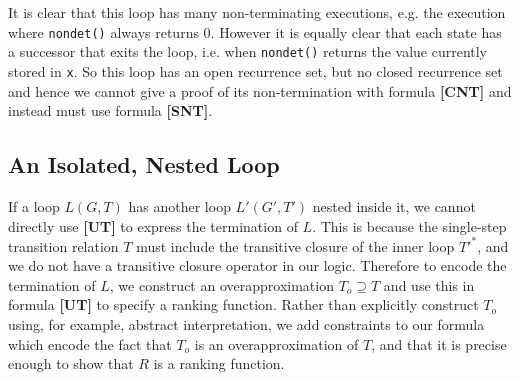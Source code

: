 \documentclass[preprint]{sigplanconf}
\theoremstyle{definition}
\begin{document}
It is clear that this loop has many non-terminating executions,
e.g. the execution where \lstinline!nondet()! always returns 0.
However it is equally clear that each state has a successor
that exits the loop, i.e. when \lstinline|nondet()| returns
the value currently stored in \lstinline|x|.  So this loop
has an open recurrence set, but no closed recurrence set
and hence we cannot give a proof of its non-termination
with formula {\bf [CNT]} and instead must use formula {\bf [SNT]}.

% 

\subsection{An Isolated, Nested Loop}
 If a loop $L(G, T)$ has another loop $L'(G', T')$ nested inside it, we cannot directly use {\bf [UT]}
to express the termination of $L$.  This is because the single-step transition relation $T$ must
include the transitive closure of the inner loop $T'^*$, and we do not have a transitive closure
operator in our logic.  Therefore to encode the termination of $L$, we construct an overapproximation
$T_o \supseteq T$ and use this in formula {\bf [UT]} to specify a ranking function.
Rather than explicitly construct $T_o$ using, for example, abstract interpretation, we add constraints to
our formula which encode the fact that $T_o$ is an overapproximation of $T$, and that it is
precise enough to show that $R$ is a ranking function.
\end{document}
